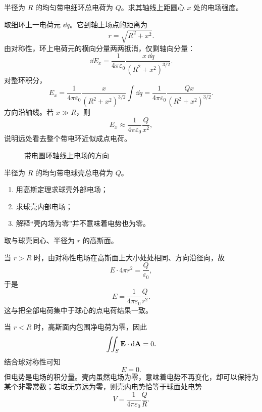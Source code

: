 \begin{competition}
半径为 $R$ 的均匀带电细环总电荷为 $Q$。求其轴线上距圆心 $x$ 处的电场强度。
\begin{solution}
取细环上一电荷元 $\dd q$。它到轴上场点的距离为
\[
r=\sqrt{R^2+x^2}.
\]
由对称性，环上电荷元的横向分量两两抵消，仅剩轴向分量：
\[
\dd E_x=\frac{1}{4\pi\varepsilon_0}\frac{x\,\dd q}{(R^2+x^2)^{3/2}}.
\]
对整环积分，
\[
E_x=\frac{1}{4\pi\varepsilon_0}\frac{x}{(R^2+x^2)^{3/2}}\int \dd q
=\frac{1}{4\pi\varepsilon_0}\frac{Qx}{(R^2+x^2)^{3/2}}.
\]
方向沿轴线。若 $x\gg R$，则
\[
E_x\approx \frac{1}{4\pi\varepsilon_0}\frac{Q}{x^2},
\]
说明远处看去整个带电环近似成点电荷。

\begin{figure}[H]
\centering
{}
\caption{带电圆环轴线上电场的方向}
\end{figure}
\end{solution}
\end{competition}

\begin{competition}
半径为 $R$ 的均匀带电球壳总电荷为 $Q$。
\begin{enumerate}
  \item 用高斯定理求球壳外部电场；
  \item 求球壳内部电场；
  \item 解释“壳内场为零”并不意味着电势也为零。
\end{enumerate}
\begin{solution}
取与球壳同心、半径为 $r$ 的高斯面。

当 $r>R$ 时，由对称性电场在高斯面上大小处处相同、方向沿径向，故
\[
E\cdot 4\pi r^2=\frac{Q}{\varepsilon_0},
\]
于是
\[
E=\frac{1}{4\pi\varepsilon_0}\frac{Q}{r^2}.
\]
这与把全部电荷集中于球心的点电荷结果一致。

当 $r<R$ 时，高斯面内包围净电荷为零，因此
\[
\iint_{S} \vb{E}\cdot \dd\vb{A}=0.
\]
结合球对称性可知
\[
E=0.
\]
但电势是电场的积分量。壳内虽然电场为零，意味着电势不再变化，却可以保持为某个非零常数；若取无穷远为零，则壳内电势恰等于球面处电势
\[
V=\frac{1}{4\pi\varepsilon_0}\frac{Q}{R}.
\]
\end{solution}
\end{competition}

